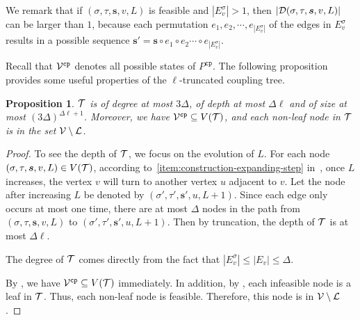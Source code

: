 \documentclass[11pt]{article}
\newtheorem{proposition}[theorem]{Proposition}
\newcommand{\abs}[1]{\left\vert#1\right\vert}
\def\!#1{\mathtt{#1}}
\def\cp{\!{cp}}
\newcommand{\seqS}{\boldsymbol{s}}
\newcommand{\hktodo}[1]{{\color{blue}{#1}}}
\begin{document}
We remark that if $(\sigma,\tau,\seqS,v,L)$ is feasible and $\abs{E^{\sigma}_v} > 1$, then $\abs{\+D(\sigma,\tau,\seqS,v,L)}$ can be larger than $1$, because each permutation $e_1,e_2,\cdots,e_{\abs{E^{\sigma}_v}}$ of the edges in $E^{\sigma}_v$ results in a possible sequence $\seqS' = \seqS\circ e_1 \circ e_2\cdots\circ e_{\abs{E^{\sigma}_v}}$.



Recall that $\+V^{\!{cp}}$ denotes all possible states of $P^{\!{cp}}$. The following proposition provides some useful properties of the $\ell$-truncated coupling tree.


\begin{proposition} \label{prop:property-of-truncated-tree}
$\mathcal{T}$ is of degree at most $3\Delta$, of depth at most $\Delta \ell$ and of size at most $\left(3\Delta\right)^{\Delta \ell + 1}$.
Moreover, we have $\+V^{\cp} \subseteq V(\+T)$, and each non-leaf node in $\mathcal{T}$ is in the set $\mathcal{V}\setminus\mathcal{L}$.
\end{proposition}

\hktodo{polish the proof here}
\begin{proof}
	To see the depth of $\mathcal{T}$, we focus on the evolution of $L$. For each node $(\sigma, \tau, \seqS, v, L) \in V(\+T)$, according to~\eqref{item:construction-expanding-step} in~, once $L$ increases, the vertex $v$ will turn to another vertex $u$ adjacent to $v$. Let the node after increasing $L$ be denoted by $(\sigma', \tau', \seqS', u, L + 1)$. Since each edge only occurs at most one time, there are at most $\Delta$ nodes in the path from $(\sigma, \tau, \seqS, v, L)$ to $(\sigma', \tau', \seqS', u, L + 1)$. Then by truncation, the depth of $\mathcal{T}$ is at most $\Delta \ell$.
	
	The degree of $\mathcal{T}$ comes directly from the fact that $\abs{E_v^\sigma} \le \abs{E_v} \le \Delta$.

    \hktodo{rewrite this paragraph}
    
    By , 
    we have $\+V^{\cp} \subseteq V(\+T)$ immediately.
    In addition, by ,  each infeasible node is a leaf in $\mathcal{T}$.
    Thus, each non-leaf node is feasible.
    Therefore, this node is in $ \mathcal{V}\setminus\mathcal{L}$.
    
\end{proof}

\end{document}
